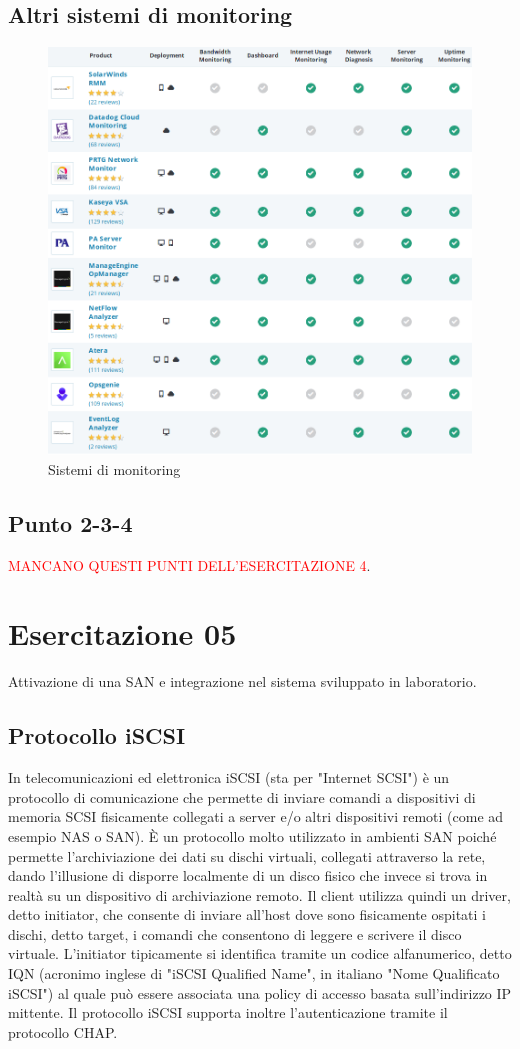 \documentclass{article}
\begin{document}
\subsection{Altri sistemi di monitoring}
\begin{figure}[H]
    \center
    \includegraphics[scale=0.45]{images/tabC.png}
    \caption{Sistemi di monitoring}\label{fig:1}
\end{figure}
\subsection{Punto 2-3-4}
\textcolor{red}{MANCANO QUESTI PUNTI DELL'ESERCITAZIONE 4}.
\section{Esercitazione 05}
Attivazione di una SAN e integrazione nel sistema sviluppato in laboratorio.
\subsection{Protocollo iSCSI}
In telecomunicazioni ed elettronica iSCSI (sta per "Internet SCSI") è un protocollo di comunicazione che permette di inviare comandi a dispositivi di memoria SCSI fisicamente collegati a server e/o altri dispositivi remoti (come ad esempio NAS o SAN). È un protocollo molto utilizzato in ambienti SAN poiché permette l'archiviazione dei dati su dischi virtuali, collegati attraverso la rete, dando l'illusione di disporre localmente di un disco fisico che invece si trova in realtà su un dispositivo di archiviazione remoto.
Il client utilizza quindi un driver, detto initiator, che consente di inviare all'host dove sono fisicamente ospitati i dischi, detto target, i comandi che consentono di leggere e scrivere il disco virtuale. L'initiator tipicamente si identifica tramite un codice alfanumerico, detto IQN (acronimo inglese di "iSCSI Qualified Name", in italiano "Nome Qualificato iSCSI") al quale può essere associata una policy di accesso basata sull'indirizzo IP mittente.
Il protocollo iSCSI supporta inoltre l'autenticazione tramite il protocollo CHAP.
\end{document}

